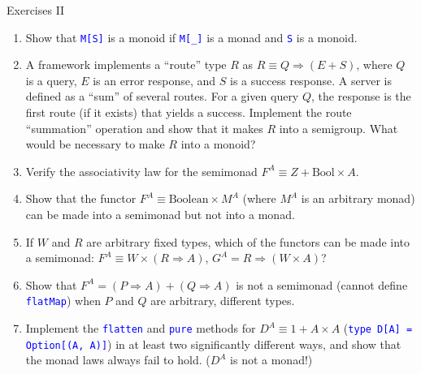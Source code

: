 \documentclass[english]{beamer}
\begin{document}
\begin{frame}{Exercises II}
\begin{enumerate}
\item \vspace*{-0.2cm}Show that \texttt{\textcolor{blue}{\footnotesize{}M{[}S{]}}}
is a monoid if \texttt{\textcolor{blue}{\footnotesize{}M{[}\_{]}}}
is a monad and \texttt{\textcolor{blue}{\footnotesize{}S}} is a monoid.
\item A framework implements a ``route'' type $R$ as $R\equiv Q\Rightarrow\left(E+S\right)$,
where $Q$ is a query, $E$ is an error response, and $S$ is a success
response. A server is defined as a ``sum'' of several routes. For
a given query $Q$, the response is the first route (if it exists)
that yields a success. Implement the route ``summation'' operation
and show that it makes $R$ into a semigroup. What would be necessary
to make $R$ into a monoid?
\item Verify the associativity law for the semimonad $F^{A}\equiv Z+\text{Bool}\times A$.
\item Show that the functor $F^{A}\equiv\text{Boolean}\times M^{A}$ (where
$M^{A}$ is an arbitrary monad) can be made into a semimonad but not
into a monad.
\item If $W$ and $R$ are arbitrary fixed types, which of the functors
can be made into a semimonad: $F^{A}\equiv W\times\left(R\Rightarrow A\right)$,
$G^{A}=R\Rightarrow\left(W\times A\right)$?
\item Show that $F^{A}=\left(P\Rightarrow A\right)+\left(Q\Rightarrow A\right)$
is not a semimonad (cannot define \texttt{\textcolor{blue}{\footnotesize{}flatMap}})
when $P$ and $Q$ are arbitrary, different types.
\item Implement the \texttt{\textcolor{blue}{\footnotesize{}flatten}} and
\texttt{\textcolor{blue}{\footnotesize{}pure}} methods for $D^{A}\equiv1+A\times A$
(\texttt{\textcolor{blue}{\footnotesize{}type D{[}A{]} = Option{[}(A,
A){]}}}) in at least two significantly different ways, and show that
the monad laws always fail to hold. ($D^{A}$ is not a monad!)
\end{enumerate}
\end{frame}
\end{document}
